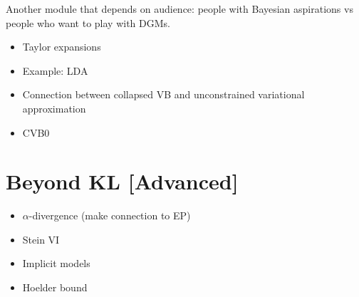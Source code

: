 \documentclass[11pt, a4paper]{article}
\begin{document}
Another module that depends on audience: people with Bayesian aspirations vs people who want to play with DGMs.

\begin{itemize}
\item Taylor expansions
\item Example: LDA
\item Connection between collapsed VB and unconstrained variational approximation \citep{TehEtAl:2007}
\item CVB0 \citep{AsuncionEtAl:2009}
\end{itemize}

\section{Beyond KL [Advanced]}
\begin{itemize}
\item $ \alpha $-divergence (make connection to EP)
\item Stein VI
\item Implicit models
\item Hoelder bound
\end{itemize}




\end{document}
